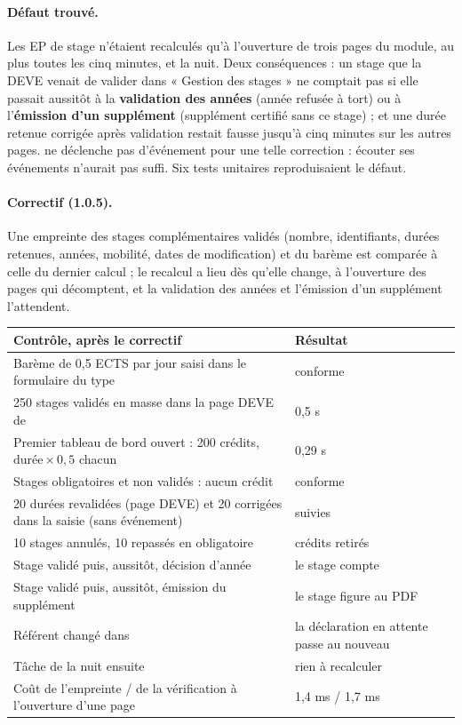 \documentclass[11pt,a4paper]{article}
\newcommand{\code}[1]{\texttt{\detokenize{#1}}}
\begin{document}
\paragraph{Défaut trouvé.} Les EP de stage n'étaient recalculés qu'à l'ouverture de trois pages
du module, au plus toutes les cinq minutes, et la nuit. Deux conséquences : un stage que la DEVE
venait de valider dans « Gestion des stages » ne comptait pas si elle passait aussitôt à la
\textbf{validation des années} (année refusée à tort) ou à l'\textbf{émission d'un supplément}
(supplément certifié sans ce stage) ; et une durée retenue corrigée après validation restait
fausse jusqu'à cinq minutes sur les autres pages. \code{mod_stage} ne déclenche pas d'événement
pour une telle correction : écouter ses événements n'aurait pas suffi. Six tests unitaires
reproduisaient le défaut.

\paragraph{Correctif (1.0.5).} Une empreinte des stages complémentaires validés (nombre,
identifiants, durées retenues, années, mobilité, dates de modification) et du barème est comparée
à celle du dernier calcul ; le recalcul a lieu dès qu'elle change, à l'ouverture des pages qui
décomptent, et la validation des années et l'émission d'un supplément l'attendent.

\begin{center}
\begin{tabularx}{\linewidth}{@{}X l@{}}
\toprule
\textbf{Contrôle, après le correctif} & \textbf{Résultat} \\
\midrule
Barème de 0,5 ECTS par jour saisi dans le formulaire du type & conforme \\
250 stages validés en masse dans la page DEVE de \code{mod_stage} & 0,5 s \\
Premier tableau de bord ouvert : 200 crédits, $\text{durée} \times 0{,}5$ chacun & 0,29 s \\
Stages obligatoires et non validés : aucun crédit & conforme \\
20 durées revalidées (page DEVE) et 20 corrigées dans la saisie (sans événement) & suivies \\
10 stages annulés, 10 repassés en obligatoire & crédits retirés \\
Stage validé puis, aussitôt, décision d'année & le stage compte \\
Stage validé puis, aussitôt, émission du supplément & le stage figure au PDF \\
Référent changé dans \code{mod_stage} & la déclaration en attente passe au nouveau \\
Tâche de la nuit ensuite & rien à recalculer \\
Coût de l'empreinte / de la vérification à l'ouverture d'une page & 1,4 ms / 1,7 ms \\
\bottomrule
\end{tabularx}
\end{center}
\end{document}
